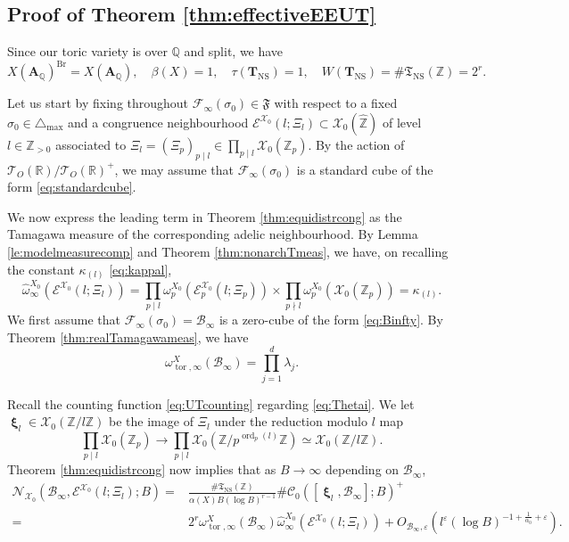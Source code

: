 \documentclass[11pt,letterpaper]{amsart}
\newcommand{\BQ}{{\mathbb {Q}}}
\newcommand{\BR}{{\mathbb {R}}}
\newcommand{\BZ}{{\mathbb {Z}}}
\newcommand{\CB}{{\mathcal {B}}}
\newcommand{\CC}{{\mathcal {C}}}
\newcommand{\CE}{{\mathcal {E}}}
\newcommand{\CF}{{\mathcal {F}}}
\newcommand{\CN}{{\mathcal {N}}}
\newcommand{\CT}{{\mathcal {T}}}
\newcommand{\CX}{{\mathcal {X}}}
\newcommand{\RA}{{\mathbf {A}}}
\newcommand{\CTNS}{\mathbf{T}_{\operatorname{NS}}}
\newcommand{\FTNS}{\mathfrak{T}_{\operatorname{NS}}}
\DeclareMathOperator{\bxi}{\mathbf{\xi}}
\theoremstyle{plain}
\numberwithin{equation}{section}
\theoremstyle{definition}
\theoremstyle{remark}
\begin{document}
\subsection{Proof of Theorem \ref{thm:effectiveEEUT}}

Since our toric variety is over $\BQ$ and split, we have $$X(\RA_\BQ)^{\operatorname{Br}}=X(\RA_\BQ),\quad \beta(X)=1,\quad \tau(\CTNS)=1,\quad W(\CTNS)=\#\FTNS(\BZ)=2^r.$$

Let us start by fixing throughout $\CF_\infty(\sigma_0)\in\mathfrak{F}$ with respect to a fixed $\sigma_0\in\triangle_{\max}$ and a congruence neighbourhood $\CE^{\CX_0}(l;\Xi_l)\subset \CX_0(\widehat{\BZ})$ of level $l\in\BZ_{>0}$ associated to $\Xi_l=(\Xi_p)_{p\mid l}\in\prod_{p\mid l}\CX_0(\BZ_p)$. By the action of $\CT_{O}(\BR)/\CT_{O}(\BR)^+$, we may assume that $\CF_\infty(\sigma_0)$ is a standard cube of the form \eqref{eq:standardcube}.

We now express the leading term in Theorem \ref{thm:equidistrcong} as the Tamagawa measure of the corresponding adelic neighbourhood. By Lemma \ref{le:modelmeasurecomp} and Theorem \ref{thm:nonarchTmeas}, we have, on recalling the constant $\kappa_{(l)}$ \eqref{eq:kappal},
$$\widehat{\omega}_{\infty}^{X_0}(\CE^{\CX_0}(l;\Xi_l))=\prod_{p\mid l}\omega^{X_0}_{p}(\CE_p^{\CX_0}(l;\Xi_p))\times \prod_{p\nmid l}\omega^{X_0}_{p}(\CX_0(\BZ_p))=\kappa_{(l)}.$$
We first assume that $\CF_\infty(\sigma_0)=\CB_\infty$ is a zero-cube of the form \eqref{eq:Binfty}. By Theorem \ref{thm:realTamagawameas}, we have $$\omega^X_{\operatorname{tor},\infty}(\CB_\infty)=\prod_{j=1}^{d}\lambda_{j}.$$ 

Recall the counting function \eqref{eq:UTcounting} regarding \eqref{eq:Thetai}. We let $\bxi_l\in \CX_0(\BZ/l\BZ)$ be the image of $\Xi_l$ under the reduction modulo $l$ map
$$\prod_{p\mid l}\CX_0(\BZ_p)\to\prod_{p\mid l}\CX_0(\BZ/p^{\operatorname{ord}_p(l)}\BZ)\simeq\CX_0(\BZ/l\BZ).$$ Theorem \ref{thm:equidistrcong} now implies that as $B\to\infty$ depending on $\CB_\infty$,
\begin{equation}\label{eq:stepCB}
	\begin{split}
	\CN_{\CX_0}(\CB_\infty,\CE^{\CX_0}(l;\Xi_l);B)=&\frac{\#\FTNS(\BZ)}{\alpha(X)B(\log B)^{r-1}}\#\CC_0([\bxi_l,\CB_\infty];B)^+\\
=&2^{r}\omega^X_{\operatorname{tor},\infty}(\CB_\infty)\widehat{\omega}_{\infty}^{X_0}(\CE^{\CX_0}(l;\Xi_l))+O_{\CB_\infty,\varepsilon}(l^\varepsilon (\log B)^{-1+\frac{1}{\alpha_0}+\varepsilon}).\end{split}
\end{equation} 
\end{document}

